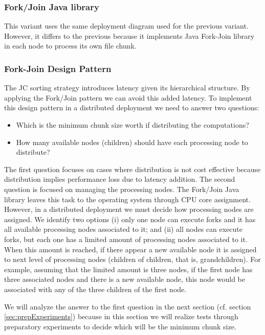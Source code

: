 \subsubsection{Fork/Join Java library}
This variant uses the same deployment diagram used for the previous variant. However, it differs to the previous because it implements Java Fork-Join library in each node to process its own file chunk.

\subsubsection{Fork-Join Design Pattern}
The JC sorting strategy introduces latency given its hierarchical structure. By applying the Fork/Join pattern we can avoid this added latency. To implement this design pattern in a distributed deployment we need to answer two questions:
 \begin{itemize}
 	\item Which is the minimum chunk size worth if distributing the computations?
 	\item How many available nodes (children) should have each processing node to distribute?
 \end{itemize}
  
  The first question focuses on cases where distribution is not cost effective because distribution implies performance loss due to latency addition. The second question is focused on managing the processing nodes. The Fork/Join Java library leaves this task to the operating system through CPU core assignment. However, in a distributed deployment we must decide how processing nodes are assigned. We identify two options (i) only one node can execute forks and it has all available processing nodes associated to it; and (ii) all nodes can execute forks, but each one has a limited amount of processing nodes associated to it. When this amount is reached, if there appear a new available node it is assigned to next level of processing nodes (children of children, that is, grandchildren). For example, assuming that the limited amount is three nodes, if the first node has three associated nodes and there is a new available node, this node would be associated with any of the three children of the first node.

We will analyze the answer to the first question in the next section (cf. section \ref{sec:prepExperiments}) because in this section we will realize tests through preparatory experiments to decide which will be the minimum chunk size.

